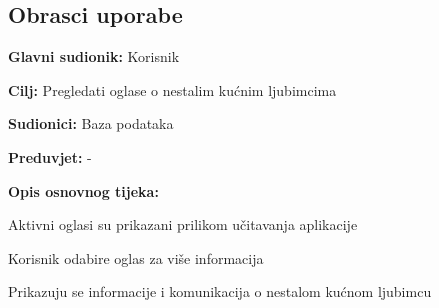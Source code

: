 \eject 



\subsection{Obrasci uporabe}




\noindent {}
\begin{packed_item}
	
	\item \textbf{Glavni sudionik: }Korisnik
	\item  \textbf{Cilj:} Pregledati oglase o nestalim kućnim ljubimcima
	\item  \textbf{Sudionici:} Baza podataka
	\item  \textbf{Preduvjet:} -
	\item  \textbf{Opis osnovnog tijeka:}
	
	\item[] \begin{packed_enum}
		
		\item Aktivni oglasi su prikazani prilikom učitavanja aplikacije
		\item Korisnik odabire oglas za više informacija
		\item Prikazuju se informacije i komunikacija o nestalom kućnom ljubimcu

	\end{packed_enum}
	
\end{packed_item}

